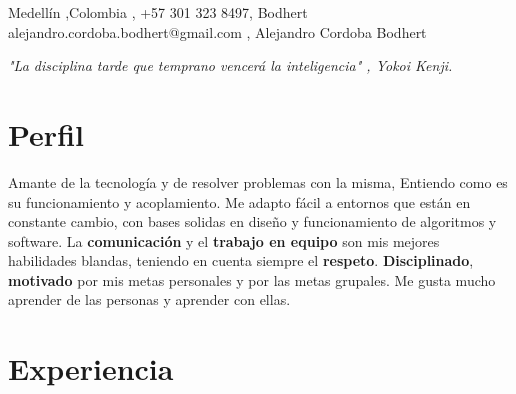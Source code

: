 \documentclass[
    changecolor={111, 156, 45}, 
]{cv-roald}
\begin{document}
\pagestyle{empty} %

 {%
  \faMapMarker \FAspace Medellín \sep Colombia \sep%
  \faMobile \FAspace +57 301 323 8497\sep%
  \faGithub Bodhert \FAspace {}
 }
 {%
  \faEnvelope \FAspace alejandro.cordoba.bodhert@gmail.com \sep%
  \faLinkedinSquare  \FAspace Alejandro Cordoba Bodhert \FAspace {}
 }




\textit{"La disciplina tarde que temprano vencerá la inteligencia" , \textit{Yokoi Kenji}.}

\section*{Perfil}

 Amante de la tecnología y de resolver problemas con la misma, Entiendo como es su funcionamiento y acoplamiento. Me adapto fácil a entornos que están en constante cambio, con bases solidas en diseño y funcionamiento de algoritmos y software. La \textbf{comunicación} y el \textbf{trabajo en equipo} son mis mejores habilidades blandas, teniendo en cuenta siempre el \textbf{respeto}. \textbf{Disciplinado}, \textbf{motivado} por mis metas personales y por las metas grupales. Me gusta mucho aprender de las personas y aprender con ellas.

\section*{Experiencia}
\end{document}
